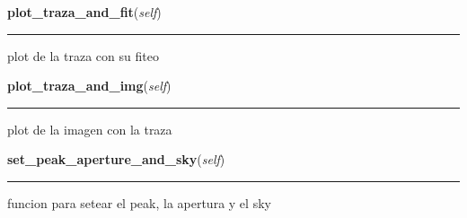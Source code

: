     \label{spectro_metria_g:spect:plot_traza_and_fit}

    \vspace{0.5ex}

\hspace{.8\funcindent}\begin{boxedminipage}{\funcwidth}

    \raggedright \textbf{plot\_traza\_and\_fit}(\textit{self})

    \vspace{-1.5ex}

    \rule{\textwidth}{0.5\fboxrule}
\setlength{\parskip}{2ex}
    plot de la traza con su fiteo

\setlength{\parskip}{1ex}
    \end{boxedminipage}

    \label{spectro_metria_g:spect:plot_traza_and_img}

    \vspace{0.5ex}

\hspace{.8\funcindent}\begin{boxedminipage}{\funcwidth}

    \raggedright \textbf{plot\_traza\_and\_img}(\textit{self})

    \vspace{-1.5ex}

    \rule{\textwidth}{0.5\fboxrule}
\setlength{\parskip}{2ex}
    plot de la imagen con la traza

\setlength{\parskip}{1ex}
    \end{boxedminipage}

    \label{spectro_metria_g:spect:set_peak_aperture_and_sky}

    \vspace{0.5ex}

\hspace{.8\funcindent}\begin{boxedminipage}{\funcwidth}

    \raggedright \textbf{set\_peak\_aperture\_and\_sky}(\textit{self})

    \vspace{-1.5ex}

    \rule{\textwidth}{0.5\fboxrule}
\setlength{\parskip}{2ex}
    funcion para setear el peak, la apertura y el sky

\setlength{\parskip}{1ex}
    \end{boxedminipage}


